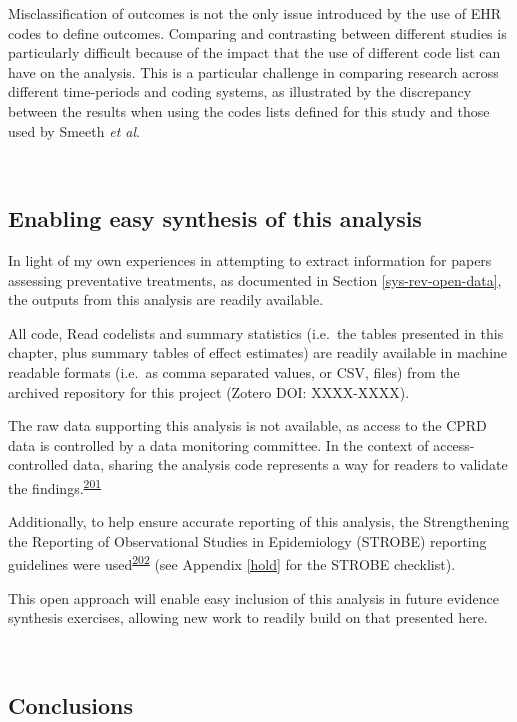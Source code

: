 \documentclass[a4paper, twoside]{templates/ociamthesis}
\begin{document}
Misclassification of outcomes is not the only issue introduced by the use of EHR codes to define outcomes. Comparing and contrasting between different studies is particularly difficult because of the impact that the use of different code list can have on the analysis. This is a particular challenge in comparing research across different time-periods and coding systems, as illustrated by the discrepancy between the results when using the codes lists defined for this study and those used by Smeeth \emph{et al}.

~

\hypertarget{cprd-data-avail}{%
\subsection{Enabling easy synthesis of this analysis}\label{cprd-data-avail}}

In light of my own experiences in attempting to extract information for papers assessing preventative treatments, as documented in Section \ref{sys-rev-open-data}, the outputs from this analysis are readily available.

All code, Read codelists and summary statistics (i.e.~the tables presented in this chapter, plus summary tables of effect estimates) are readily available in machine readable formats (i.e.~as comma separated values, or CSV, files) from the archived repository for this project (Zotero DOI: XXXX-XXXX).

The raw data supporting this analysis is not available, as access to the CPRD data is controlled by a data monitoring committee. In the context of access-controlled data, sharing the analysis code represents a way for readers to validate the findings.\textsuperscript{\protect\hyperlink{ref-goldacre2019c}{201}}

Additionally, to help ensure accurate reporting of this analysis, the Strengthening the Reporting of Observational Studies in Epidemiology (STROBE) reporting guidelines were used\textsuperscript{\protect\hyperlink{ref-vandenbroucke2007}{202}} (see Appendix \ref{hold} for the STROBE checklist).

This open approach will enable easy inclusion of this analysis in future evidence synthesis exercises, allowing new work to readily build on that presented here.

~

\hypertarget{conclusions-1}{%
\subsection{Conclusions}\label{conclusions-1}}
\end{document}
